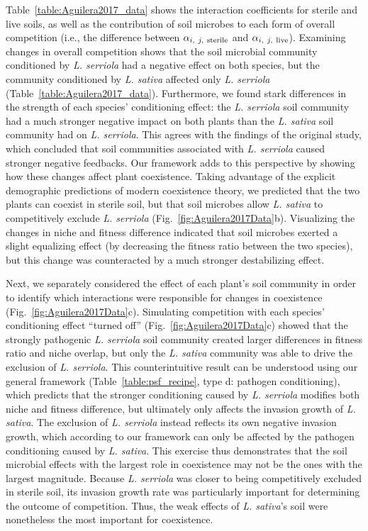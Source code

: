 Table~\ref{table:Aguilera2017_data} shows the interaction coefficients for sterile and live soils, as well as the contribution of soil microbes to each form of overall competition (i.e., the difference between $\alpha_{i,\ j,\ \textup{sterile}}$ and $\alpha_{i,\ j,\ \textup{live}}$).
Examining changes in overall competition shows that the soil microbial community conditioned by \textit{L. serriola} had a negative effect on both species, but the community conditioned by \textit{L. sativa} affected only \textit{L. serriola} (Table~\ref{table:Aguilera2017_data}). Furthermore, we found stark differences in the strength of each species' conditioning effect: the \textit{L. serriola} soil community had a much stronger negative impact on both plants than the \textit{L. sativa} soil community had on \textit{L. serriola}. This agrees with the findings of the original study, which concluded that soil communities associated with \textit{L. serriola} caused stronger negative feedbacks.
Our framework adds to this perspective by showing how these changes affect plant coexistence. Taking advantage of the explicit demographic predictions of modern coexistence theory, we predicted that the two plants can coexist in sterile soil, but that soil microbes allow \textit{L. sativa} to competitively exclude \textit{L. serriola} (Fig.~\ref{fig:Aguilera2017Data}b). Visualizing the changes in niche and fitness difference indicated that soil microbes exerted a slight equalizing effect (by decreasing the fitness ratio between the two species), but this change was counteracted by a much stronger destabilizing effect.
\par


Next, we separately considered the effect of each plant's soil community in order to identify which interactions were responsible for changes in coexistence (Fig.~\ref{fig:Aguilera2017Data}c). Simulating competition with each species' conditioning effect ``turned off'' (Fig.~\ref{fig:Aguilera2017Data}c) showed that the strongly pathogenic \textit{L. serriola} soil community created larger differences in fitness ratio and niche overlap, but only the \textit{L. sativa} community was able to drive the exclusion of \textit{L. serriola}.
This counterintuitive result can be understood using our general framework (Table~\ref{table:psf_recipe}, type d: pathogen conditioning), which predicts that the stronger conditioning caused by \textit{L. serriola} modifies both niche and fitness difference, but ultimately only affects the invasion growth of \textit{L. sativa}. The exclusion of \textit{L. serriola} instead reflects its own negative invasion growth, which according to our framework can only be affected by the pathogen conditioning caused by \textit{L. sativa}.
This exercise thus demonstrates that the soil microbial effects with the largest role in coexistence may not be the ones with the largest magnitude.
Because \textit{L. serriola} was closer to being competitively excluded in sterile soil, its invasion growth rate was particularly important for determining the outcome of competition. Thus, the weak effects of \textit{L. sativa}'s soil were nonetheless the most important for coexistence.
\par


